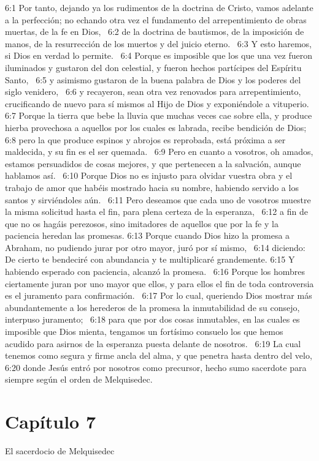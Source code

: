 6:1 Por tanto, dejando ya los rudimentos de la doctrina de Cristo, vamos adelante a la perfección; no echando otra vez el fundamento del arrepentimiento de obras muertas, de la fe en Dios,  
6:2 de la doctrina de bautismos, de la imposición de manos, de la resurrección de los muertos y del juicio eterno.  
6:3 Y esto haremos, si Dios en verdad lo permite.  
6:4 Porque es imposible que los que una vez fueron iluminados y gustaron del don celestial, y fueron hechos partícipes del Espíritu Santo,  
6:5 y asimismo gustaron de la buena palabra de Dios y los poderes del siglo venidero,  
6:6 y recayeron, sean otra vez renovados para arrepentimiento, crucificando de nuevo para sí mismos al Hijo de Dios y exponiéndole a vituperio.  
6:7 Porque la tierra que bebe la lluvia que muchas veces cae sobre ella, y produce hierba provechosa a aquellos por los cuales es labrada, recibe bendición de Dios;  
6:8 pero la que produce espinos y abrojos es reprobada, está próxima a ser maldecida, y su fin es el ser quemada.  
6:9 Pero en cuanto a vosotros, oh amados, estamos persuadidos de cosas mejores, y que pertenecen a la salvación, aunque hablamos así.  
6:10 Porque Dios no es injusto para olvidar vuestra obra y el trabajo de amor que habéis mostrado hacia su nombre, habiendo servido a los santos y sirviéndoles aún.  
6:11 Pero deseamos que cada uno de vosotros muestre la misma solicitud hasta el fin, para plena certeza de la esperanza,  
6:12 a fin de que no os hagáis perezosos, sino imitadores de aquellos que por la fe y la paciencia heredan las promesas. 
6:13 Porque cuando Dios hizo la promesa a Abraham, no pudiendo jurar por otro mayor, juró por sí mismo,  
6:14 diciendo: De cierto te bendeciré con abundancia y te multiplicaré grandemente. 
6:15 Y habiendo esperado con paciencia, alcanzó la promesa.  
6:16 Porque los hombres ciertamente juran por uno mayor que ellos, y para ellos el fin de toda controversia es el juramento para confirmación.  
6:17 Por lo cual, queriendo Dios mostrar más abundantemente a los herederos de la promesa la inmutabilidad de su consejo, interpuso juramento;  
6:18 para que por dos cosas inmutables, en las cuales es imposible que Dios mienta, tengamos un fortísimo consuelo los que hemos acudido para asirnos de la esperanza puesta delante de nosotros.  
6:19 La cual tenemos como segura y firme ancla del alma, y que penetra hasta dentro del velo, 
6:20 donde Jesús entró por nosotros como precursor, hecho sumo sacerdote para siempre según el orden de Melquisedec. 
\section*{Capítulo 7 }
El sacerdocio de Melquisedec  

